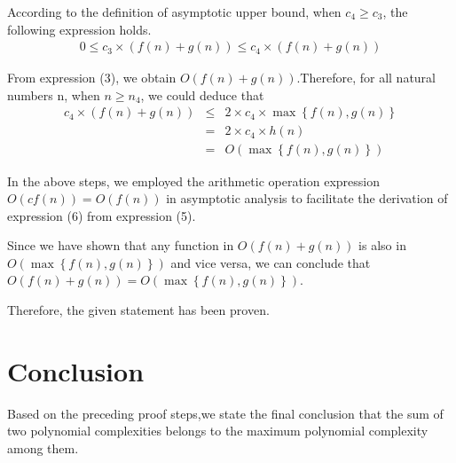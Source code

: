 \documentclass[UTF8]{ctexart}
\begin{document}
According to the definition of asymptotic upper bound, when $c_4\geq c_3$, the following expression holds.
\begin{eqnarray}
0\le c_3\times \left ( f(n)+g(n) \right )\le c_4\times  \left ( f(n)+g(n) \right ) 
\end{eqnarray}


From expression (3), we obtain $O ( f(n)+g(n))$.Therefore, for all natural numbers n, when $n \geq n_4$, we could deduce that
\begin{eqnarray}
c_4\times  \left ( f(n)+g(n) \right ) &\le& 2\times c_4\times \max \left \{ f(n),g(n) \right \}  \\
&=&2\times c_4 \times h(n)   \\
&=&O \left ( \max \left \{ f(n),g(n) \right \}  \right ) 
\end{eqnarray}


In the above steps, we employed the arithmetic operation expression $O \left ( cf(n) \right )  = O (f(n))$ in asymptotic analysis to facilitate the derivation of expression (6) from expression (5).


Since we have shown that any function in $O \left ( f(n)+g(n) \right )$  is also in $O \left ( \max \left \{ f(n),g(n) \right \}  \right )$  and vice versa,
we can conclude that $O \left ( f(n)+g(n) \right )=  O \left ( \max \left \{ f(n),g(n) \right \}  \right ) $.


Therefore, the given statement has been proven.
\section{Conclusion}
Based on the preceding proof steps,we state the final conclusion that the sum of two polynomial complexities belongs to the maximum polynomial complexity among them.
\end{document}
